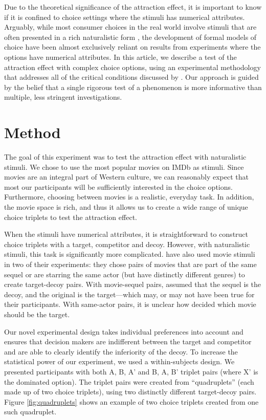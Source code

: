 \documentclass[12pt, a4paper]{article}
\begin{document}
Due to the theoretical significance of the attraction effect, it is important to know if it is confined to choice settings where the stimuli has numerical attributes. Arguably, while most consumer choices in the real world involve stimuli that are often presented in a rich naturalistic form \cite{Bhatia2018b}, the development of formal models of choice have been almost exclusively reliant on results from experiments where the options have numerical attributes. 
In this article, we describe a test of the attraction effect with complex choice options, using an experimental methodology that addresses all of the critical conditions discussed by . Our approach is guided by the belief that a single rigorous test of a phenomenon is more informative than multiple, less stringent investigations.

\section*{Method}

The goal of this experiment was to test the attraction effect with naturalistic stimuli. We chose to use the most popular movies on IMDb as stimuli. Since movies are an integral part of Western culture, we can reasonably expect that most our participants will be sufficiently interested in the choice options. Furthermore, choosing between movies is a realistic, everyday task. In addition, the movie space is rich, and thus it allows us to create a wide range of unique choice triplets to test the attraction effect.

When the stimuli have numerical attributes, it is straightforward to construct choice triplets with a target, competitor and decoy. However, with naturalistic stimuli, this task is significantly more complicated.  have also used movie stimuli in two of their experiments: they chose pairs of movies that are part of the same sequel or are starring the same actor (but have distinctly different genres) to create target-decoy pairs. With movie-sequel pairs, \citeauthor{Frederick2014} assumed that the sequel is the decoy, and the original is the target---which may, or may not have been true for their participants. With same-actor pairs, it is unclear how \citeauthor{Frederick2014} decided which movie should be the target.

Our novel experimental design takes individual preferences into account and ensures that decision makers are indifferent between the target and competitor and are able to clearly identify the inferiority of the decoy. To increase the statistical power of our experiment, we used a within-subjects design. We presented participants with both A, B, A' and B, A, B' triplet pairs (where X' is the dominated option). The triplet pairs were created from ``quadruplets'' (each made up of two choice triplets), using two distinctly different target-decoy pairs. Figure \ref{fig:quadruplets} shows an example of two choice triplets created from one such quadruplet.
\end{document}
